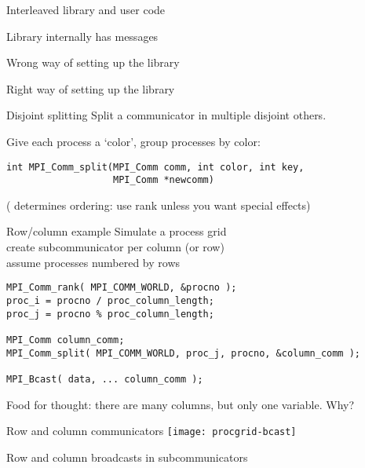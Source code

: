 \begin{numberedframe}{Interleaved library and user code}
\end{numberedframe}
\begin{numberedframe}{Library internally has messages}
\end{numberedframe}
\begin{numberedframe}{Wrong way of setting up the library}
\end{numberedframe}

\begin{numberedframe}{Right way of setting up the library}
\end{numberedframe}

\begin{numberedframe}{Disjoint splitting}
  Split a communicator in multiple disjoint others.
  
Give each process a `color', group processes by color:
\lstset{language=C}
\begin{lstlisting}
int MPI_Comm_split(MPI_Comm comm, int color, int key, 
                   MPI_Comm *newcomm)  
\end{lstlisting}
( determines ordering: use rank unless you want special effects)
\end{numberedframe}

\begin{numberedframe}{Row/column example}
  Simulate a process grid\\
  create subcommunicator per column (or row)\\
  assume processes numbered by rows
\begin{lstlisting}
MPI_Comm_rank( MPI_COMM_WORLD, &procno );
proc_i = procno / proc_column_length;
proc_j = procno % proc_column_length;

MPI_Comm column_comm;
MPI_Comm_split( MPI_COMM_WORLD, proc_j, procno, &column_comm );

MPI_Bcast( data, ... column_comm );
\end{lstlisting}
Food for thought: there are many columns,
but only one  variable. Why?
\end{numberedframe}

\begin{numberedframe}{Row and column communicators}
  \texttt{[image: procgrid-bcast]}

  Row and column broadcasts in subcommunicators
\end{numberedframe}

